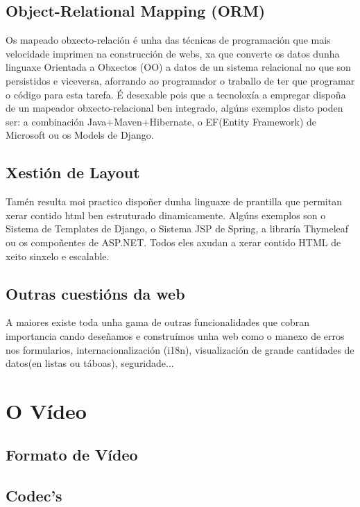 	\subsection{Object-Relational Mapping (ORM)}
		Os mapeado obxecto-relación é unha das técnicas de programación que mais velocidade imprimen
		na construcción de webs, xa que converte os datos dunha linguaxe Orientada a Obxectos (OO) a 
		datos de un sistema relacional no que son persistidos e viceversa, aforrando ao programador
		o traballo de ter que programar o código para esta tarefa. É desexable pois que a tecnoloxía
		a empregar dispoña de un mapeador obxecto-relacional ben integrado, algúns exemplos disto poden
		ser: a combinación Java+Maven+Hibernate, o EF(Entity Framework) de Microsoft ou os Models de Django.
	
	\subsection{Xestión de Layout}
		Tamén resulta moi practico dispoñer dunha linguaxe de prantilla que permitan xerar contido
		html ben estruturado dinamicamente. Algúns exemplos son o Sistema de Templates de Django, o 
		Sistema JSP de Spring, a libraría Thymeleaf ou os compoñentes de ASP.NET. Todos eles axudan 
		a xerar contido HTML de xeito sinxelo e escalable.
		
	\subsection{Outras cuestións da web}
		A maiores existe toda unha gama de outras funcionalidades que cobran importancia cando deseñamos
		e construímos unha web como o manexo de erros nos formularios, internacionalización (i18n), 
		visualización de grande cantidades de datos(en listas ou táboas), seguridade...
		
		
\section{O Vídeo}

    \subsection{Formato de Vídeo}
    
    \subsection{Codec's}

